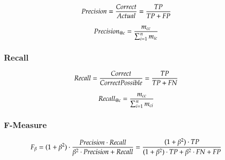 \documentclass[10pt]{article}
\newif\ifen
\newif\ifde
\newcommand{\en}[1]{\ifen#1\fi}
\newcommand{\de}[1]{\ifde#1\fi}
\begin{document}
			\begin{equation}
				Precision = {{Correct} \over {Actual}} = {{TP} \over {TP + FP}}
			\end{equation}

			\de{Oder genauer für die Klasse c:}
			\en{Or more precisely for class c:}

			\begin{equation}
				Precision_{@c} = {{m_{cc}} \over {\sum_{i=1}^{n} m_{ic}}}
			\end{equation}

		\subsubsection{Recall}
			\de{Recall\autocite{noauthor_precision_2020} ist die Genauigkeit einer Klasse. Das bedeutet wie gut konnte die Klasse vorhergesehen werden:}
			\en{Recall\autocite{noauthor_precision_2020} is the accuracy of a class. This means how well the class could be predicted:}

			\begin{equation}
				Recall = {{Correct} \over {CorrectPossible}} = {{TP} \over {TP + FN}}
			\end{equation}

			\de{Oder genauer für die Klasse c:}
			\en{Or more precisely for class c:}

			\begin{equation}
				Recall_{@c} = {{m_{cc}} \over {\sum_{i=1}^{n} m_{ci}}}
			\end{equation}

		\subsubsection{F-Measure}
			\de{F-Measure\autocite{noauthor_f1_2020} kombiniert Präzision und Rückruf, wobei der Parameter \(\beta\) die Gewichtung darstellt:}
			\en{F-Measure\autocite{noauthor_f1_2020} combines precision and recall, with the parameter \(\beta\) representing the weighting:}
			\begin{equation}
				F_\beta =
				(1 + \beta^2) \cdot {{Precision\cdot Recall}\over{\beta^2 \cdot Precision + Recall}} = 
				{{(1 + \beta^2) \cdot TP}\over{(1 + \beta^2) \cdot TP + \beta^2 \cdot FN + FP}}
			\end{equation}
\end{document}
